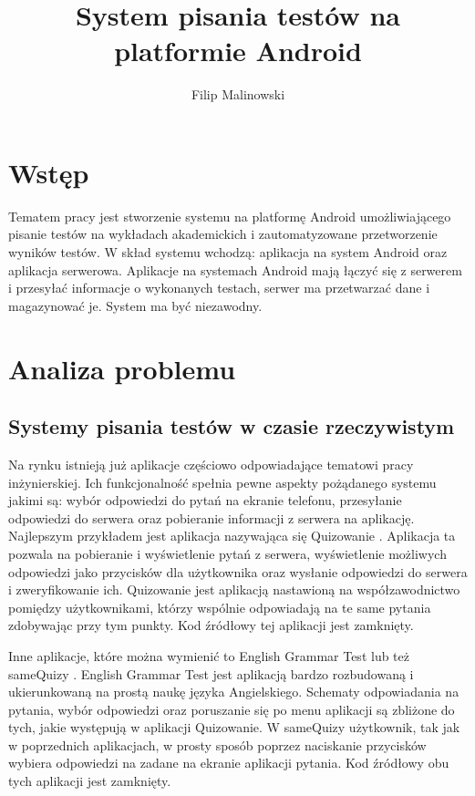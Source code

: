 \documentclass[eng]{mgr}
\title{System pisania testów na platformie Android}
\author{Filip Malinowski}
\begin{document}
\maketitle

\tableofcontents

	\chapter*{Wstęp}
	
	Tematem pracy jest stworzenie systemu na platformę Android umożliwiającego pisanie testów na wykładach akademickich i zautomatyzowane przetworzenie wyników testów. W skład systemu wchodzą: aplikacja na system Android oraz aplikacja serwerowa. Aplikacje na systemach Android mają łączyć się z serwerem i przesyłać informacje o wykonanych testach, serwer ma przetwarzać dane i magazynować je. System ma być niezawodny.

	
	\chapter{Analiza problemu}
	
		\section{Systemy pisania testów w czasie rzeczywistym}
		Na rynku istnieją już aplikacje częściowo odpowiadające tematowi pracy inżynierskiej. Ich funkcjonalność spełnia pewne aspekty pożądanego systemu jakimi są: wybór odpowiedzi do pytań na ekranie telefonu, przesyłanie odpowiedzi do serwera oraz pobieranie informacji z serwera na aplikację. Najlepszym przykładem jest aplikacja nazywająca się Quizowanie \cite{quizowanie}. Aplikacja ta pozwala na pobieranie i wyświetlenie pytań z serwera, wyświetlenie możliwych odpowiedzi jako przycisków dla użytkownika oraz wysłanie odpowiedzi do serwera i zweryfikowanie ich. Quizowanie jest aplikacją nastawioną na współzawodnictwo pomiędzy użytkownikami, którzy wspólnie odpowiadają na te same pytania zdobywając przy tym punkty. Kod źródłowy tej aplikacji jest zamknięty.
	
		Inne aplikacje, które można wymienić to English Grammar Test \cite{englishgrammar} lub też sameQuizy \cite{samequizy}. English Grammar Test jest aplikacją bardzo rozbudowaną i ukierunkowaną na prostą naukę języka Angielskiego. Schematy odpowiadania na pytania, wybór odpowiedzi oraz poruszanie się po menu aplikacji są zbliżone do tych, jakie występują w aplikacji Quizowanie. W sameQuizy użytkownik, tak jak w poprzednich aplikacjach, w prosty sposób poprzez naciskanie przycisków wybiera odpowiedzi na zadane na ekranie aplikacji pytania. Kod źródłowy obu tych aplikacji jest zamknięty.
		
\end{document}
